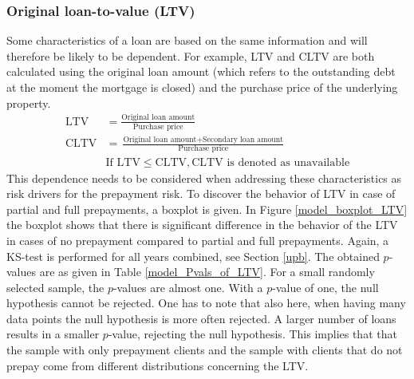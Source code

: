     \subsubsection{Original loan-to-value (LTV)}\label{orig_ltv}
        Some characteristics of a loan are based on the same information
        and will therefore be likely to be dependent. 
        For example, LTV and CLTV 
        are both calculated using the original loan amount
        (which refers to the outstanding debt at the moment the 
        mortgage is closed) and the purchase price of the
        underlying property. 
        \begin{align}
            \text{LTV}&=
            \frac{\text{Original loan amount}}{\text{Purchase price}}\\
            \text{CLTV}&=
            \frac{\text{Original loan amount}+\text{Secondary loan amount}}{\text{Purchase price}}\\
            &\text{If } \text{LTV} \leq \text{CLTV}, \text{CLTV} \text{ is denoted as unavailable}
        \end{align}
        This dependence needs to be considered when addressing these 
        characteristics as risk drivers for the prepayment risk. 
        To discover the behavior of LTV in case of partial and full
        prepayments, a boxplot is given. In Figure 
        \ref{model_boxplot_LTV} the boxplot shows that there is 
        significant difference in the behavior of the LTV in cases of 
        no prepayment compared to partial and full prepayments.
        Again, a KS-test is performed for all years combined, see
        Section \ref{upb}. The obtained $p$-values are as given in
        Table \ref{model_Pvals_of_LTV}. For a small randomly
        selected sample, the $p$-values are almost one. With a
        $p$-value of one, the null hypothesis cannot be rejected. One has to note that also here, when having many data points the null hypothesis is more often rejected. A
        larger number of loans results in a smaller $p$-value,
        rejecting the null hypothesis. This implies that that the
        sample with only prepayment clients and the sample 
        with clients that do not prepay come from different distributions concerning the LTV. 
